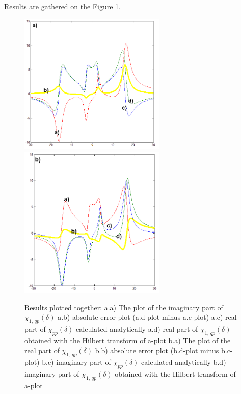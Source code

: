 \documentclass[12pt,twoside,a4paper]{article}
\numberwithin{equation}{subsection}
\numberwithin{figure}{subsection}
\begin{document}
Results are gathered on the Figure \ref{fig:htran_qp_2d}.

\begin{figure} 
  \includegraphics[width=70mm]{img/htran_qp_2da.png} 
  \includegraphics[width=70mm]{img/htran_qp_2db.png}  
  \caption{Results plotted together:
  a.a) The plot of the imaginary part of ${\chi_{1, \,qp}}(\delta )$ 
  a.b) absolute error plot (a.d-plot minus a.c-plot) 
  a.c) real part of ${\chi_{pp}}(\delta )$ calculated analytically
  a.d) real part of ${\chi_{1, \,qp}}(\delta )$ obtained with the Hilbert transform of a-plot
  b.a) The plot of the real part of ${\chi_{1, \,qp}}(\delta )$
  b.b) absolute error plot (b.d-plot minus b.c-plot)  
  b.c) imaginary part of ${\chi_{pp}}(\delta )$ calculated analytically 
  b.d) imaginary part of ${\chi_{1, \,qp}}(\delta )$ obtained with the Hilbert transform of a-plot 
  \label{fig:htran_qp_2d}}
\end{figure}
\end{document}
